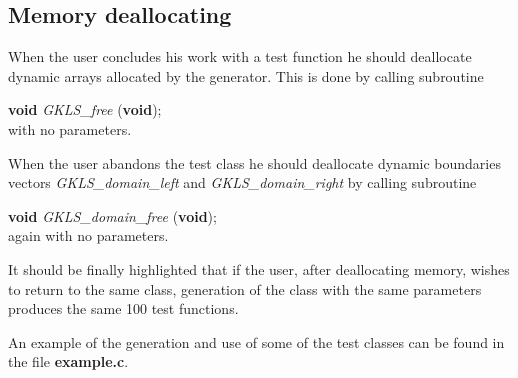 \documentclass[acmtoms]{acmtrans2m}
\begin{document}
\subsection{Memory deallocating} \label{sectionMemory}

When the user concludes his work with a test function he should
deallocate dynamic arrays allocated by the generator. This is done
by calling subroutine

{\bf void} {\it GKLS\_free} ({\bf void});\\
with no parameters.

When the user abandons the test class he should deallocate dynamic
boundaries vectors {\it GKLS\_domain\_left} and {\it
GKLS\_domain\_right} by calling subroutine

{\bf void} {\it GKLS\_domain\_free} ({\bf void});\\
again with no parameters.

It should be finally highlighted that if the user, after
deallocating memory, wishes to return to the same class,
generation of the class with the same parameters produces the same
100 test functions.

An example of the generation and use of some of the test classes
can be found in the file {\bf example.c}.




\label{@lastpg}
\end{document}
